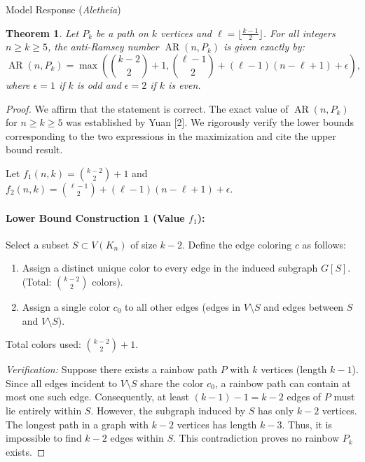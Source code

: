 \documentclass[11pt]{article}
\DeclareMathOperator{\AR}{AR}
\newtheorem{theorem}{Theorem}
\begin{document}
\begin{solution}{Model Response (\emph{Aletheia})}
\begin{theorem}
Let $P_k$ be a path on $k$ vertices and $\ell = \lfloor \frac{k-1}{2} \rfloor$. For all integers $n \ge k \ge 5$, the anti-Ramsey number $\AR(n, P_k)$ is given exactly by:
\[ \AR(n, P_k) = \max\left(\binom{k-2}{2}+1, \binom{\ell-1}{2}+(\ell-1)(n-\ell+1)+\epsilon\right), \]
where $\epsilon=1$ if $k$ is odd and $\epsilon=2$ if $k$ is even.
\end{theorem}

\begin{proof}
We affirm that the statement is correct. The exact value of $\AR(n, P_k)$ for $n \ge k \ge 5$ was established by Yuan [2]. We rigorously verify the lower bounds corresponding to the two expressions in the maximization and cite the upper bound result.

Let $f_1(n, k) = \binom{k-2}{2} + 1$ and $f_2(n, k) = \binom{\ell-1}{2} + (\ell-1)(n-\ell+1) + \epsilon$.

\paragraph{Lower Bound Construction 1 (Value $f_1$):}
Select a subset $S \subset V(K_n)$ of size $k-2$.
Define the edge coloring $c$ as follows:
\begin{enumerate}
    \item Assign a distinct unique color to every edge in the induced subgraph $G[S]$. (Total: $\binom{k-2}{2}$ colors).
    \item Assign a single color $c_0$ to all other edges (edges in $V \setminus S$ and edges between $S$ and $V \setminus S$).
\end{enumerate}
Total colors used: $\binom{k-2}{2} + 1$.

\textit{Verification:} Suppose there exists a rainbow path $P$ with $k$ vertices (length $k-1$). Since all edges incident to $V \setminus S$ share the color $c_0$, a rainbow path can contain at most one such edge. Consequently, at least $(k-1) - 1 = k-2$ edges of $P$ must lie entirely within $S$. However, the subgraph induced by $S$ has only $k-2$ vertices. The longest path in a graph with $k-2$ vertices has length $k-3$. Thus, it is impossible to find $k-2$ edges within $S$. This contradiction proves no rainbow $P_k$ exists.


\end{proof}
\end{solution}
\end{document}
